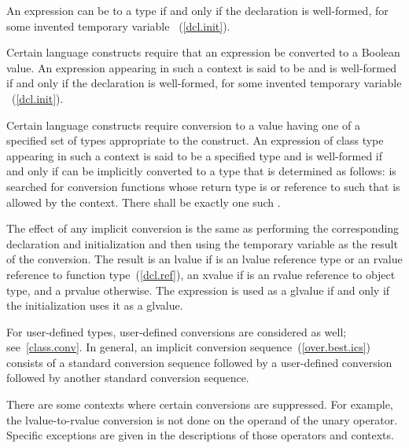 \pnum
An expression  can be
%
 to a type  if and only if the
declaration  is well-formed, for some invented temporary
variable ~(\ref{dcl.init}).

\pnum
Certain language constructs require that an expression be converted to a Boolean
value. An expression  appearing in such a context is said to be
%
 and is well-formed if and only if
the declaration  is well-formed, for some invented temporary
variable ~(\ref{dcl.init}).

\pnum
Certain language constructs require conversion to a value having
one of a specified set of types appropriate to the construct. An
expression  of class type  appearing in such a
context is said to be
%
 a specified type  and is
well-formed if and only if  can be implicitly converted to a type 
that is determined as follows:  is searched for conversion functions
whose return type is   or reference to 
 such that  is allowed by the context.
There shall be exactly one such .

\pnum
The effect of any implicit
conversion is the same as performing the corresponding declaration and initialization
and then using the temporary variable as the result of the conversion.
The result is an lvalue if  is an lvalue reference
type or an rvalue reference to function type~(\ref{dcl.ref}),
an xvalue if  is an rvalue reference to object type,
and a prvalue otherwise. The expression 
is used as a glvalue if and only if the initialization uses it as a glvalue.

\pnum
\enternote 
For user-defined types, user-defined conversions are considered as well;
see~\ref{class.conv}. In general, an implicit conversion
sequence~(\ref{over.best.ics}) consists of a standard conversion
sequence followed by a user-defined conversion followed by another
standard conversion sequence.
\exitnote 

\pnum
\enternote 
There are some contexts where certain conversions are suppressed. For
example, the lvalue-to-rvalue conversion is not done on the operand of
the unary \tcode{\&} operator. Specific exceptions are given in the
descriptions of those operators and contexts.
\exitnote 

